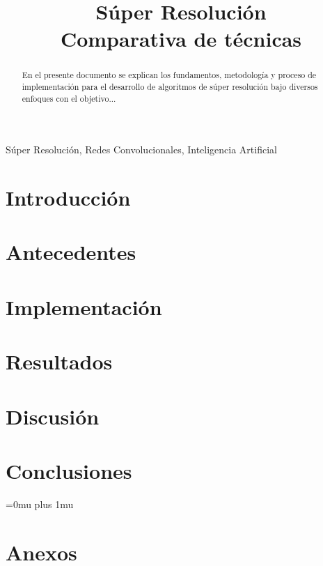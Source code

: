 \documentclass[journal, onecolumn]{IEEEtran}
\begin{document}
    \title{Súper Resolución\\
    \small{Comparativa de técnicas}}

    
    \author{
    }

    \maketitle

    \begin{abstract}
        En el presente documento se explican los fundamentos, metodología y proceso de implementación 
        para el desarrollo de algoritmos de súper resolución bajo diversos enfoques con el objetivo... 
    \end{abstract}

    \begin{IEEEkeywords}
    Súper Resolución, Redes Convolucionales, Inteligencia Artificial
    \end{IEEEkeywords}

    \section{Introducción}
    

    \section{Antecedentes}



    \section{Implementación}

    \section{Resultados}

    \section{Discusión}


    \section{Conclusiones}

    \nocite{*}

    \Urlmuskip=0mu plus 1mu\relax
    
    
    
    \section{Anexos}
\end{document}
